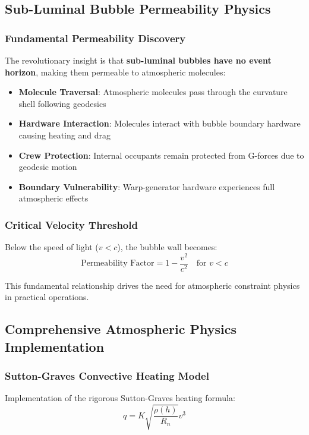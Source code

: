 \documentclass[11pt]{article}
\begin{document}
\subsection{Sub-Luminal Bubble Permeability Physics}

\subsubsection{Fundamental Permeability Discovery}
The revolutionary insight is that \textbf{sub-luminal bubbles have no event horizon}, making them permeable to atmospheric molecules:

\begin{itemize}
\item \textbf{Molecule Traversal}: Atmospheric molecules pass through the curvature shell following geodesics
\item \textbf{Hardware Interaction}: Molecules interact with bubble boundary hardware causing heating and drag
\item \textbf{Crew Protection}: Internal occupants remain protected from G-forces due to geodesic motion
\item \textbf{Boundary Vulnerability}: Warp-generator hardware experiences full atmospheric effects
\end{itemize}

\subsubsection{Critical Velocity Threshold}
Below the speed of light ($v < c$), the bubble wall becomes:
\begin{equation}
\text{Permeability Factor} = 1 - \frac{v^2}{c^2} \quad \text{for } v < c
\end{equation}

This fundamental relationship drives the need for atmospheric constraint physics in practical operations.

\subsection{Comprehensive Atmospheric Physics Implementation}

\subsubsection{Sutton-Graves Convective Heating Model}
Implementation of the rigorous Sutton-Graves heating formula:
\begin{equation}
q = K \sqrt{\frac{\rho(h)}{R_n}} v^3
\end{equation}
\end{document}
